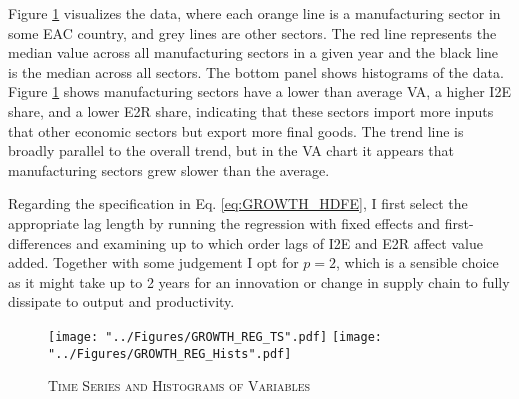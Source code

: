 \documentclass[a4paper]{article}
\begin{document}
 Figure \ref{fig:GROWTH_REG_TS} visualizes the data, where each orange line is a manufacturing sector in some EAC country, and grey lines are other sectors. The red line represents the median value across all manufacturing sectors in a given year and the black line is the median across all sectors. The bottom panel shows histograms of the data. Figure \ref{fig:GROWTH_REG_TS} shows manufacturing sectors have a lower than average VA, a higher I2E share, and a lower E2R share, indicating that these sectors import more inputs that other economic sectors but export more final goods. The trend line is broadly parallel to the overall trend, but in the VA chart it appears that manufacturing sectors grew slower than the average. \newline %

Regarding the specification in Eq. \ref{eq:GROWTH_HDFE}, I first select the appropriate lag length by running the regression with fixed effects and first-differences and examining up to which order lags of I2E and E2R affect value added. Together with some judgement I opt for $p = 2$, which is a sensible choice as it might take up to 2 years for an innovation or change in supply chain to fully dissipate to output and productivity.

\begin{figure}[h!]
\centering
\caption{\label{fig:GROWTH_REG_TS}\textsc{Time Series and Histograms of Variables}}
\texttt{[image: "../Figures/GROWTH\_REG\_TS".pdf]}
\texttt{[image: "../Figures/GROWTH\_REG\_Hists".pdf]} %
\end{figure}
\FloatBarrier


\end{document}
